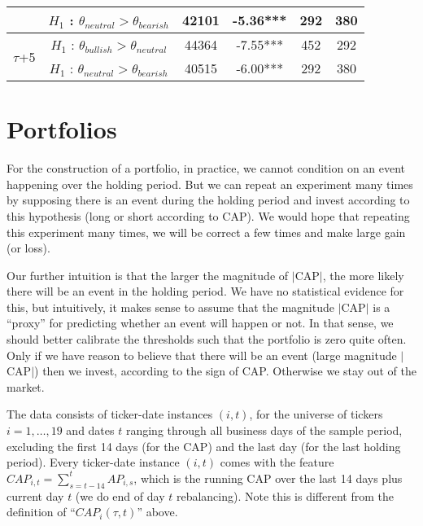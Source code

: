 \begin{table}[]
\begin{tabular}{|c|c|c|c|c|c|}
                                           & $H_1$ : $\theta_{neutral} > \theta_{bearish}$  & 42101 & -5.36*** & 292  & 380  \\ \hline
\multirow{2}{*}{$\tau$+5}                       & $H_1$ : $\theta_{bullish} > \theta_{neutral}$ & 44364 & -7.55*** & 452  & 292  \\
                                           & $H_1$ : $\theta_{neutral} > \theta_{bearish}$  & 40515 & -6.00*** & 292  & 380  \\ \hline
\end{tabular}
\label{utest_res}
\end{table}

\section{Portfolios} \label{S:portfolios}

For the construction of a portfolio, in practice, we cannot condition on an event happening over the holding period. But we can repeat an experiment many times by supposing there is an event during the holding period and invest according to this hypothesis (long or short according to CAP). We would hope that repeating this experiment many times, we will be correct a few times and make large gain (or loss).

Our further intuition is that the larger the magnitude of $\mid$CAP$\mid$, the more likely there will be an event in the holding period. We have no statistical evidence for this, but intuitively, it makes sense to assume that the magnitude $\mid$CAP$\mid$ is a  “proxy” for predicting whether an event will happen or not. In that sense, we should better calibrate the thresholds such that the portfolio is zero quite often. Only if we have reason to believe that there will be an event (large magnitude $\mid$CAP$\mid$) then we invest, according to the sign of CAP. Otherwise we stay out of the market.

The data consists of ticker-date instances $(i,t)$, for the universe of tickers $i=1,\dots,19$ and dates $t$ ranging through all business days of the sample period, excluding the first 14 days (for the CAP) and the last day (for the last holding period). Every ticker-date instance $(i,t)$ comes with the feature $CAP_{i,t}=\sum_{s=t-14}^t AP_{i,s}$, which is the running CAP over the last 14 days plus current day $t$ (we do end of day $t$ rebalancing). Note this is different from the definition of ``$CAP_i(\tau,t)$'' above.
    
